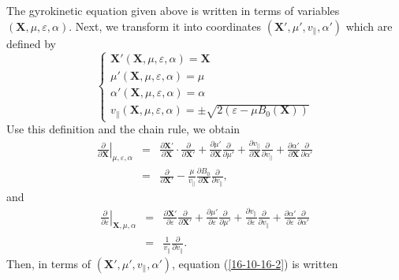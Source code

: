 \documentclass{article}
\begin{document}
The gyrokinetic equation given above is written in terms of variables
$(\mathbf{X}, \mu, \varepsilon, \alpha)$. Next, we transform it into
coordinates $(\mathbf{X}', \mu', v_{\parallel}, \alpha')$ which are defined by
\begin{equation}
  \left\{ \begin{array}{l}
    \mathbf{X}' (\mathbf{X}, \mu, \varepsilon, \alpha) =\mathbf{X}\\
    \mu' (\mathbf{X}, \mu, \varepsilon, \alpha) = \mu\\
    \alpha' (\mathbf{X}, \mu, \varepsilon, \alpha) = \alpha\\
    v_{\parallel} (\mathbf{X}, \mu, \varepsilon, \alpha) = \pm \sqrt{2
    (\varepsilon - \mu B_0 (\mathbf{X}))}
  \end{array} \right.
\end{equation}
Use this definition and the chain rule, we obtain
\begin{eqnarray}
  \left. \frac{\partial}{\partial \mathbf{X}} \right|_{\mu, \varepsilon,
  \alpha} & = & \frac{\partial \mathbf{X}'}{\partial \mathbf{X}} \cdot
  \frac{\partial}{\partial \mathbf{X}'} + \frac{\partial \mu'}{\partial
  \mathbf{X}}  \frac{\partial}{\partial \mu'} + \frac{\partial
  v_{\parallel}}{\partial \mathbf{X}}  \frac{\partial}{\partial v_{\parallel}}
  + \frac{\partial \alpha' }{\partial \mathbf{X}}  \frac{\partial}{\partial
  \alpha'} \nonumber\\
  & = & \frac{\partial}{\partial \mathbf{X}'} - \frac{\mu}{v_{\parallel}} 
  \frac{\partial B_0}{\partial \mathbf{X}}  \frac{\partial}{\partial
  v_{\parallel}},  \label{19-1-2-e1}
\end{eqnarray}
and
\begin{eqnarray}
  \left. \frac{\partial}{\partial \varepsilon} \right|_{\mathbf{X}, \mu,
  \alpha} & = & \frac{\partial \mathbf{X}'}{\partial \varepsilon}
  \frac{\partial}{\partial \mathbf{X}'} + \frac{\partial \mu'}{\partial
  \varepsilon} \frac{\partial}{\partial \mu'} + \frac{\partial
  v_{\parallel}}{\partial \varepsilon} \frac{\partial}{\partial v_{\parallel}}
  + \frac{\partial \alpha'}{\partial \varepsilon} \frac{\partial}{\partial
  \alpha'} \nonumber\\
  & = &  \frac{1}{v_{\parallel}}  \frac{\partial}{\partial v_{\parallel}} . 
\end{eqnarray}
Then, in terms of $(\mathbf{X}', \mu', v_{\parallel}, \alpha')$, equation
(\ref{16-10-16-2}) is written
\end{document}
